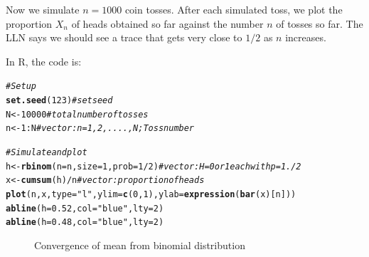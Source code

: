 \documentclass[english,12pt]{book}\usepackage[]{graphicx}\usepackage[]{xcolor}
\makeatletter
\newcommand{\hlnum}[1]{\textcolor[rgb]{0.686,0.059,0.569}{#1}}%
\newcommand{\hlsng}[1]{\textcolor[rgb]{0.192,0.494,0.8}{#1}}%
\newcommand{\hlcom}[1]{\textcolor[rgb]{0.678,0.584,0.686}{\textit{#1}}}%
\newcommand{\hlopt}[1]{\textcolor[rgb]{0,0,0}{#1}}%
\newcommand{\hldef}[1]{\textcolor[rgb]{0.345,0.345,0.345}{#1}}%
\newcommand{\hlkwb}[1]{\textcolor[rgb]{0.69,0.353,0.396}{#1}}%
\newcommand{\hlkwc}[1]{\textcolor[rgb]{0.333,0.667,0.333}{#1}}%
\newcommand{\hlkwd}[1]{\textcolor[rgb]{0.737,0.353,0.396}{\textbf{#1}}}%
\newenvironment{kframe}{%
 \def\at@end@of@kframe{}%
 \ifinner\ifhmode%
  \def\at@end@of@kframe{\end{minipage}}%
  \begin{minipage}{\columnwidth}%
 \fi\fi%
 \def\FrameCommand##1{\hskip\@totalleftmargin \hskip-\fboxsep
 \colorbox{shadecolor}{##1}\hskip-\fboxsep
     \hskip-\linewidth \hskip-\@totalleftmargin \hskip\columnwidth}%
 \MakeFramed {\advance\hsize-\width
   \@totalleftmargin\z@ \linewidth\hsize
   \@setminipage}}%
 {\par\unskip\endMakeFramed%
 \at@end@of@kframe}
\newenvironment{knitrout}{}{} %
\makeatother
\begin{document}
\begin{example}
Now we simulate $n = 1000$ coin tosses. After each simulated toss, we plot the proportion $X_n$ of heads obtained so far against the number $n$ of tosses so far. The LLN says we should see a trace that gets very close to $1/2$ as $n$ increases.

In R, the code is:

\begin{knitrout}
\color{fgcolor}\begin{kframe}
\begin{alltt}
\hlcom{# Set up}
\hlkwd{set.seed}\hldef{(}\hlnum{123}\hldef{)}                            \hlcom{# set seed}
\hldef{N} \hlkwb{<-} \hlnum{10000}                               \hlcom{# total number of tosses}
\hldef{n} \hlkwb{<-} \hlnum{1}\hlopt{:}\hldef{N}                                 \hlcom{# vector: n = 1, 2, ...., N; Toss number}

\hlcom{# Simulate and plot}
\hldef{h} \hlkwb{<-} \hlkwd{rbinom}\hldef{(}\hlkwc{n} \hldef{= n,} \hlkwc{size} \hldef{=} \hlnum{1}\hldef{,} \hlkwc{prob} \hldef{=} \hlnum{1}\hlopt{/}\hlnum{2}\hldef{)} \hlcom{# vector: H = 0 or 1 each with p = 1./2}
\hldef{x} \hlkwb{<-} \hlkwd{cumsum}\hldef{(h)} \hlopt{/} \hldef{n}                       \hlcom{# vector: proportion of heads}
\hlkwd{plot}\hldef{(n, x,} \hlkwc{type} \hldef{=} \hlsng{"l"}\hldef{,} \hlkwc{ylim} \hldef{=} \hlkwd{c}\hldef{(}\hlnum{0}\hldef{,} \hlnum{1}\hldef{),} \hlkwc{ylab} \hldef{=} \hlkwd{expression}\hldef{(}\hlkwd{bar}\hldef{(x)[n]))}
\hlkwd{abline}\hldef{(}\hlkwc{h} \hldef{=} \hlnum{0.52}\hldef{,} \hlkwc{col} \hldef{=} \hlsng{"blue"}\hldef{,} \hlkwc{lty} \hldef{=} \hlnum{2}\hldef{)}
\hlkwd{abline}\hldef{(}\hlkwc{h} \hldef{=} \hlnum{0.48}\hldef{,} \hlkwc{col} \hldef{=} \hlsng{"blue"}\hldef{,} \hlkwc{lty} \hldef{=} \hlnum{2}\hldef{)}
\end{alltt}
\end{kframe}
\end{knitrout}

\begin{figure}[H]
  \caption{Convergence of mean from binomial distribution}
    \label{fig:CLTbinomial}
     \centering
    \begin{minipage}{.9\linewidth}
\begin{knitrout}
\color{fgcolor}


\end{knitrout}
\end{minipage}
\end{figure}
\end{example}
\end{document}
